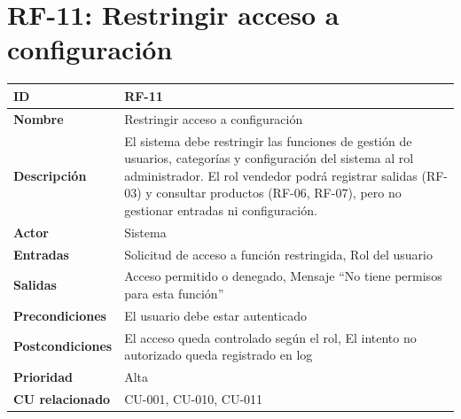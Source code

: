\documentclass{article}
\begin{document}
\section*{RF-11: Restringir acceso a configuración}
\begin{center}
\renewcommand{\arraystretch}{1.4}
\begin{tabular}{|L{4cm}|L{12cm}|}
\hline
\textbf{ID} & RF-11 \\
\hline
\textbf{Nombre} & Restringir acceso a configuración \\
\hline
\textbf{Descripción} & El sistema debe restringir las funciones de gestión de usuarios, categorías y configuración del sistema al rol administrador. El rol vendedor podrá registrar salidas (RF-03) y consultar productos (RF-06, RF-07), pero no gestionar entradas ni configuración. \\
\hline
\textbf{Actor} & Sistema \\
\hline
\textbf{Entradas} & Solicitud de acceso a función restringida, Rol del usuario \\
\hline
\textbf{Salidas} & Acceso permitido o denegado, Mensaje ``No tiene permisos para esta función'' \\
\hline
\textbf{Precondiciones} & El usuario debe estar autenticado \\
\hline
\textbf{Postcondiciones} & El acceso queda controlado según el rol, El intento no autorizado queda registrado en log \\
\hline
\textbf{Prioridad} & Alta \\
\hline
\textbf{CU relacionado} & CU-001, CU-010, CU-011 \\
\hline
\end{tabular}
\end{center}
\end{document}
